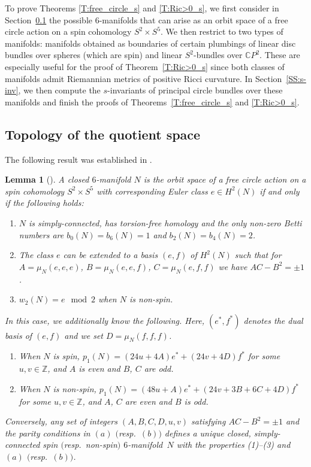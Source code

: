 \documentclass[pdftex]{sigma}
\numberwithin{equation}{section}
\newtheorem{Lemma}[Theorem]{Lemma}
\theoremstyle{definition}
\numberwithin{table}{section}
\newcommand{\Z}{\mathbb{Z}}
\newcommand{\C}{\mathbb{C}}
\begin{document}
To prove Theorems \ref{T:free_circle_s} and \ref{T:Ric>0_s}, we first consider in Section~\ref{SS:quot_space} the possible $6$-manifolds that can arise as an orbit space of a free circle action on a spin cohomology $S^2\times S^5$. We then restrict to two types of manifolds: manifolds obtained as boundaries of certain plumbings of linear disc bundles over spheres (which are spin) and linear $S^2$-bundles over $\C P^2$. These are especially useful for the proof of Theorem~\ref{T:Ric>0_s} since both classes of manifolds admit Riemannian metrics of positive Ricci curvature. In Section~\ref{SS:s-inv}, we then compute the $s$-invariants of principal circle bundles over these manifolds and finish the proofs of Theorems~\ref{T:free_circle_s} and \ref{T:Ric>0_s}.

\subsection{Topology of the quotient space} \label{SS:quot_space}

The following result was established in \cite{Xu25}.

\begin{Lemma}[{\cite[Lemmas 1 and 2]{Xu25}}]\label{L:N_orbit_space}
	A closed $6$-manifold $N$ is the orbit space of a free circle action on a spin cohomology $S^2\times S^5$ with corresponding Euler class $e\in H^2(N)$ if and only if the following holds:
	\begin{enumerate}\itemsep=0pt
		\item[$(1)$] $N$ is simply-connected, has torsion-free homology and the only non-zero Betti numbers are $b_0(N)=b_6(N)=1$ and $b_2(N)=b_4(N)=2$.
		\item[$(2)$] The class $e$ can be extended to a basis $(e,f)$ of $H^2(N)$ such that for $A=\mu_N(e,e,e)$, $B=\mu_N(e,e,f)$, $C=\mu_N(e,f,f)$ we have $AC-B^2=\pm 1$.
		\item[$(3)$] $w_2(N)=e\mod 2$ when $N$ is non-spin.
	\end{enumerate}
	In this case, we additionally know the following. Here, $(e^*,f^*)$ denotes the dual basis of $(e,f)$ and we set $D=\mu_N(f,f,f)$.
	\begin{enumerate}\itemsep=0pt
		\item[$(a)$] When $N$ is spin, $p_1(N)=(24u+4A)e^*+(24v+4D)f^*$ for some $u,v\in\Z$, and $A$ is even and $B$, $C$ are odd.
		\item[$(b)$] When $N$ is non-spin, $p_1(N)=(48u+A)e^*+(24v+3B+6C+4D)f^*$ for some $u,v\in\Z$, and $A$, $C$ are even and $B$ is odd.
	\end{enumerate}
	Conversely, any set of integers $(A,B,C,D,u,v)$ satisfying $AC-B^2=\pm1$ and the parity conditions in $(a)$ $($resp.\ $(b))$ defines a unique closed, simply-connected spin $($resp.\ non-spin$)$ $6$-mani\-fold~$N$ with the properties {\rm (1)--(3)} and $(a)$ $($resp.\ $(b))$.
\end{Lemma}
\end{document}
